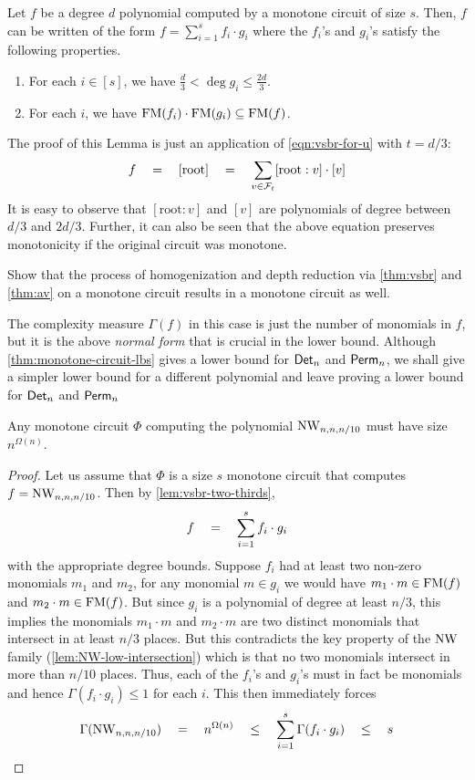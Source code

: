 \begin{lemma}\label{lem:vsbr-two-thirds}
  Let $f$ be a degree $d$ polynomial computed by a monotone circuit of size $s$. 
Then, $f$ can be written of the form $f = \sum_{i=1}^s f_i \cdot g_i$ where the $f_i$'s and $g_i$'s satisfy the following properties.
\begin{enumerate}
\item For each $i\in [s]$, we have $\frac{d}{3} < \deg{g_i} \leq
  \frac{2d}{3}$.
\item For each $i$, we have $\mathrm{FM}(f_i)\cdot \mathrm{FM}(g_i) \subseteq \mathrm{FM}(f)$.
\end{enumerate}
\end{lemma}
\begin{proof-sketch}
The proof of this Lemma is just an application of \eqref{eqn:vsbr-for-u} with $t = d/3$: 
\[
f\quad = \quad [\mathrm{root}] \quad = \quad \sum_{v\in \mathcal{F}_t} [\mathrm{root}:v] \cdot [v]
\]
It is easy to observe that $[\mathrm{root}:v]$ and $[v]$ are polynomials of degree between $d/3$ and $2d/3$. 
Further, it can also be seen that the above equation  preserves monotonicity if the original circuit was monotone. 
\end{proof-sketch}

\begin{exercise}
Show that the process of homogenization and depth reduction via \autoref{thm:vsbr} and \autoref{thm:av} on a monotone circuit results in a  monotone circuit as well. 
\end{exercise}


The complexity measure $\Gamma(f)$ in this case is just the number of monomials in $f$, but it is the above \emph{normal form} that is crucial in the lower bound. 
Although \autoref{thm:monotone-circuit-lbs} gives a lower bound for $\operatorname{\mathsf{Det}}_n$ and $\operatorname{\mathsf{Perm}}_n$, we shall give a simpler lower bound for a different polynomial and leave proving a lower bound for $\operatorname{\mathsf{Det}}_n$ and $\operatorname{\mathsf{Perm}}_n$ 


\begin{theorem}
Any monotone circuit $\Phi$ computing the polynomial $\operatorname{\mathrm{NW}}_{n,n,n/10}$  must have size $n^{\Omega(n)}$. 
\end{theorem}
\begin{proof}
  Let us assume that $\Phi$ is a size $s$ monotone circuit that computes $f = \operatorname{\mathrm{NW}}_{n,n,n/10}$. 
Then by \autoref{lem:vsbr-two-thirds},
  \[
  f \quad = \quad \sum_{i=1}^s f_i \cdot g_i
  \]
  with the appropriate degree bounds. 
Suppose $f_i$ had at least two non-zero monomials $m_1$ and $m_2$, for any monomial $m \in g_i$ we would have $m_1 \cdot m \in \mathrm{FM}(f)$ and $m_2 \cdot m \in \mathrm{FM}(f)$. 
But since $g_i$ is a polynomial of degree at least $n/3$, this implies the monomials $m_1\cdot m$ and $m_2 \cdot m$ are two distinct monomials that intersect in at least $n/3$ places. 
But this contradicts the key property of the $\operatorname{\mathrm{NW}}$ family (\autoref{lem:NW-low-intersection}) which is that no two monomials intersect in more than $n/10$ places. 
Thus, each of the $f_i$'s and $g_i$'s must in fact be monomials and hence $\Gamma(f_i\cdot g_i) \leq 1$ for each $i$. 
This then immediately forces 
\[
\Gamma(\operatorname{\mathrm{NW}}_{n,n,n/10}) \quad = \quad n^{\Omega(n)} \quad \leq \quad \sum_{i=1}^s \Gamma(f_i \cdot g_i) \quad \leq \quad s
\]
\end{proof}

